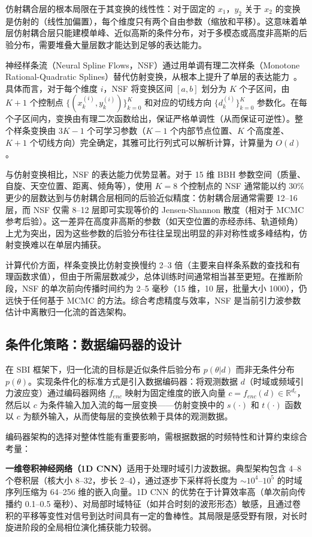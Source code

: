 仿射耦合层的根本局限在于其变换的线性性：对于固定的 $x_1$，$y_2$ 关于 $x_2$ 的变换是仿射的（线性加偏置），每个维度只有两个自由参数（缩放和平移）。这意味着单层仿射耦合层只能建模单峰、近似高斯的条件分布，对于多模态或高度非高斯的后验分布，需要堆叠大量层数才能达到足够的表达能力。

神经样条流（Neural Spline Flows，NSF）通过用单调有理二次样条（Monotone Rational-Quadratic Splines）替代仿射变换，从根本上提升了单层的表达能力~\cite{Durkan2019NSF}。具体而言，对于每个维度 $i$，NSF 将变换区间 $[a, b]$ 划分为 $K$ 个子区间，由 $K+1$ 个控制点 $\{(x_k^{(i)}, y_k^{(i)})\}_{k=0}^{K}$ 和对应的切线方向 $\{d_k^{(i)}\}_{k=0}^{K}$ 参数化。在每个子区间内，变换由有理二次函数给出，保证严格单调性（从而保证可逆性）。整个样条变换由 $3K - 1$ 个可学习参数（$K-1$ 个内部节点位置、$K$ 个高度差、$K+1$ 个切线方向）完全确定，其雅可比行列式可以解析计算，计算量为 $O(d)$。

与仿射变换相比，NSF 的表达能力优势显著。对于 15 维 BBH 参数空间（质量、自旋、天空位置、距离、倾角等），使用 $K = 8$ 个控制点的 NSF 通常能以约 30\% 更少的层数达到与仿射耦合层相同的后验近似精度：仿射耦合层通常需要 12--16 层，而 NSF 仅需 8--12 层即可实现等价的 Jensen-Shannon 散度（相对于 MCMC 参考后验）。这一差异在高度非高斯的参数（如天空位置的赤经赤纬、轨道倾角）上尤为突出，因为这些参数的后验分布往往呈现出明显的非对称性或多峰结构，仿射变换难以在单层内捕获。

计算代价方面，样条变换比仿射变换慢约 2--3 倍（主要来自样条系数的查找和有理函数求值），但由于所需层数减少，总体训练时间通常相当甚至更短。在推断阶段，NSF 的单次前向传播时间约为 2--5 毫秒（15 维，10 层，批量大小 1000），仍远快于任何基于 MCMC 的方法。综合考虑精度与效率，NSF 是当前引力波参数估计中离散归一化流的首选架构。

\subsection{条件化策略：数据编码器的设计}

在 SBI 框架下，归一化流的目标是近似条件后验分布 $p(\theta|d)$ 而非无条件分布 $p(\theta)$。实现条件化的标准方式是引入数据编码器：将观测数据 $d$（时域或频域引力波应变）通过编码器网络 $f_{enc}$ 映射为固定维度的嵌入向量 $c = f_{enc}(d) \in \mathbb{R}^{d_c}$，然后以 $c$ 为条件输入加入流的每一层变换——仿射变换中的 $s(\cdot)$ 和 $t(\cdot)$ 函数以 $c$ 为额外输入，从而使每层的变换依赖于具体的观测数据。

编码器架构的选择对整体性能有重要影响，需根据数据的时频特性和计算约束综合考量：

\textbf{一维卷积神经网络（1D CNN）}适用于处理时域引力波数据。典型架构包含 4--8 个卷积层（核大小 8--32，步长 2--4），通过逐步下采样将长度为 $\sim 10^4$--$10^5$ 的时域序列压缩为 64--256 维的嵌入向量。1D CNN 的优势在于计算效率高（单次前向传播约 0.1--0.5 毫秒）、对局部时域特征（如并合时刻的波形形态）敏感，且通过卷积的平移等变性对信号到达时间具有一定的鲁棒性。其局限是感受野有限，对长时旋进阶段的全局相位演化捕获能力较弱。

